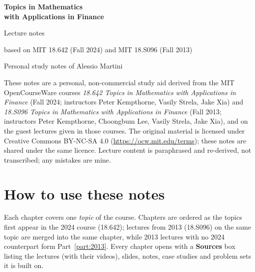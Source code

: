 \ifdefined\publicmode\documentclass[11pt,oneside,openany]{book}\else\documentclass[12pt,oneside,openany]{book}\fi
\begin{document}
\else
\begin{titlepage}
  \centering
  \vspace*{3cm}
  {\Huge\bfseries Topics in Mathematics\\[4pt] with Applications in Finance\par}
  \vspace{1cm}
  {\Large Lecture notes\par}
  \vspace{0.5cm}
  {\large based on MIT 18.642 (Fall 2024) and MIT 18.S096 (Fall 2013)\par}
  \vspace{2cm}
  {\large Personal study notes of Alessio Martini\par}
  \vfill
  \begin{minipage}{0.85\textwidth}\small
    These notes are a personal, non-commercial study aid derived from the MIT OpenCourseWare
    courses \emph{18.642 Topics in Mathematics with Applications in Finance} (Fall 2024;
    instructors Peter Kempthorne, Vasily Strela, Jake Xia) and \emph{18.S096 Topics in
    Mathematics with Applications in Finance} (Fall 2013; instructors Peter Kempthorne,
    Choongbum Lee, Vasily Strela, Jake Xia), and on the guest lectures given in those courses.
    The original material is licensed under Creative Commons BY-NC-SA 4.0
    (\url{https://ocw.mit.edu/terms}); these notes are shared under the same licence.
    Lecture content is paraphrased and re-derived, not transcribed; any mistakes are mine.
  \end{minipage}
  \vspace{1cm}
\end{titlepage}
\fi

\chapter*{How to use these notes}
\ifdefined\publicmode
Each chapter covers one \emph{topic} of the course. Chapters are ordered as the topics first
appear in the 2024 course (18.642); lectures from 2013 (18.S096) on the same topic are merged
into the same chapter, while 2013 lectures with no 2024 counterpart form
Part~\ref{part:2013}. Every chapter opens with a \textbf{Sources} box listing the lectures
(with their videos), slides, notes, case studies and problem sets it is built on.
\end{document}
